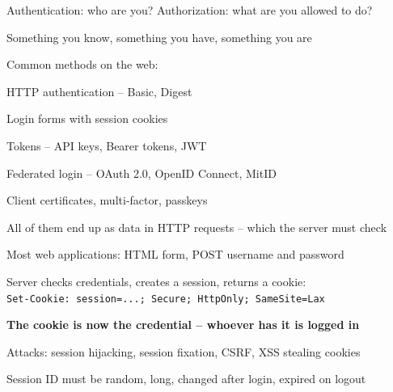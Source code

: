 \documentclass[Screen16to9,17pt]{foils}
\begin{document}



\begin{list2}
\item Authentication: who are you? Authorization: what are you allowed to do?
\item Something you know, something you have, something you are
\item Common methods on the web:
  \begin{list2}
  \item HTTP authentication -- Basic, Digest
  \item Login forms with session cookies
  \item Tokens -- API keys, Bearer tokens, JWT
  \item Federated login -- OAuth 2.0, OpenID Connect, MitID
  \item Client certificates, multi-factor, passkeys
  \end{list2}
\item All of them end up as data in HTTP requests -- which the server must check
\end{list2}



\begin{list2}
\item Most web applications: HTML form, POST username and password
\item Server checks credentials, creates a session, returns a cookie:\\
  \verb+Set-Cookie: session=...; Secure; HttpOnly; SameSite=Lax+
\item \textbf {The cookie is now the credential -- whoever has it is logged in}
\item Attacks: session hijacking, session fixation, CSRF, XSS stealing cookies
\item Session ID must be random, long, changed after login, expired on logout
\end{list2}
\end{document}

